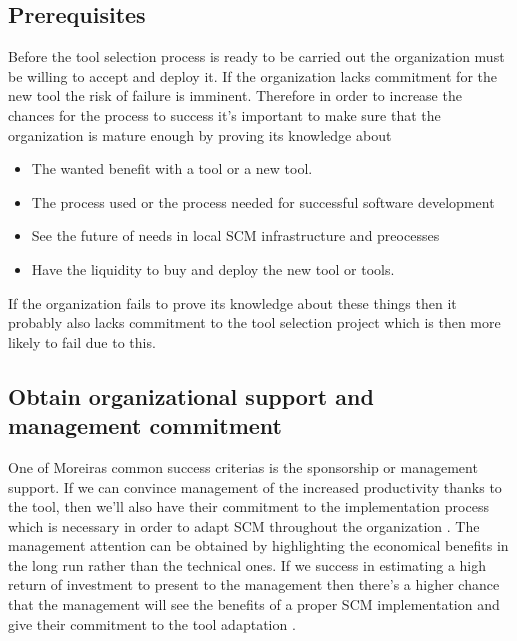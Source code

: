 \documentclass[10pt]{article}
\begin{document}
\subsection{Prerequisites}
Before the tool selection process is ready to be carried out the organization must be willing to accept and deploy it. If the organization lacks commitment for the new tool the risk of failure is imminent. Therefore in order to increase the chances for the process to success it's important to make sure that the organization is mature enough by proving its knowledge about 
\begin{itemize}
\item The wanted benefit with a tool or a new tool.
\item The process used or the process needed for successful software development
\item See the future of needs in local SCM infrastructure and preocesses
\item Have the liquidity to buy and deploy the new tool or tools.
\end{itemize}
If the organization fails to prove its knowledge about these things then it probably also lacks commitment to the tool selection project which is then more likely to fail due to this.\cite{ABB}

\subsection{Obtain organizational support and management commitment}
One of Moreiras \cite{Moreira} common success criterias is the sponsorship or management support. If we can convince management of the increased productivity thanks to the tool, then we'll also have their commitment to the implementation process which is necessary in order to adapt SCM throughout the organization \cite{Sayko}. The management attention can be obtained by highlighting the economical benefits in the long run rather than the technical ones. If we success in estimating a high return of investment to present to the management then there's a higher chance that the management will see the benefits of a proper SCM implementation and give their commitment to the tool adaptation \cite{Sayko}. 
\end{document}
